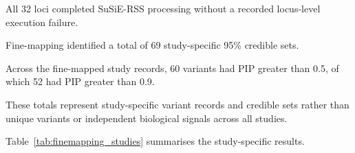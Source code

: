 \documentclass[11pt,a4paper]{article}
\begin{document}
All 32 loci completed SuSiE-RSS processing without
a recorded locus-level execution failure.

Fine-mapping identified a total of 69 study-specific
95\% credible sets.

Across the fine-mapped study records, 60 variants
had PIP greater than 0.5, of which 52 had PIP
greater than 0.9.

These totals represent study-specific variant records
and credible sets rather than unique variants or
independent biological signals across all studies.

Table~\ref{tab:finemapping_studies} summarises
the study-specific results.

\end{document}
